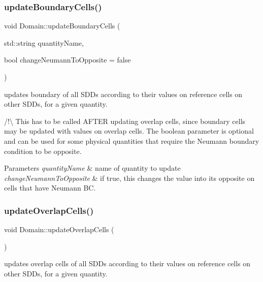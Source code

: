 \subsubsection{\texorpdfstring{update\+Boundary\+Cells()}{updateBoundaryCells()}\hspace{0.1cm}{\footnotesize\ttfamily [2/2]}}
{\footnotesize\ttfamily void Domain\+::update\+Boundary\+Cells (\begin{DoxyParamCaption}\item[{std\+::string}]{quantity\+Name,  }\item[{bool}]{change\+Neumann\+To\+Opposite = {\ttfamily false} }\end{DoxyParamCaption})}



updates boundary of all S\+D\+Ds according to their values on reference cells on other S\+D\+Ds, for a given quantity. 

/!\textbackslash{} This has to be called A\+F\+T\+ER updating overlap cells, since boundary cells may be updated with values on overlap cells. The boolean parameter is optional and can be used for some physical quantities that require the Neumann boundary condition to be opposite.


\begin{DoxyParams}{Parameters}
{\em quantity\+Name} & name of quantity to update \\
\hline
{\em change\+Neumann\+To\+Opposite} & if true, this changes the value into its opposite on cells that have Neumann BC. \\
\hline
\end{DoxyParams}
\mbox{\label{classDomain_a4411f8eb6c118c84f16d62a411b4432a}} 
\subsubsection{\texorpdfstring{update\+Overlap\+Cells()}{updateOverlapCells()}\hspace{0.1cm}{\footnotesize\ttfamily [1/2]}}
{\footnotesize\ttfamily void Domain\+::update\+Overlap\+Cells (\begin{DoxyParamCaption}{ }\end{DoxyParamCaption})}



updates overlap cells of all S\+D\+Ds according to their values on reference cells on other S\+D\+Ds, for a given quantity. 


